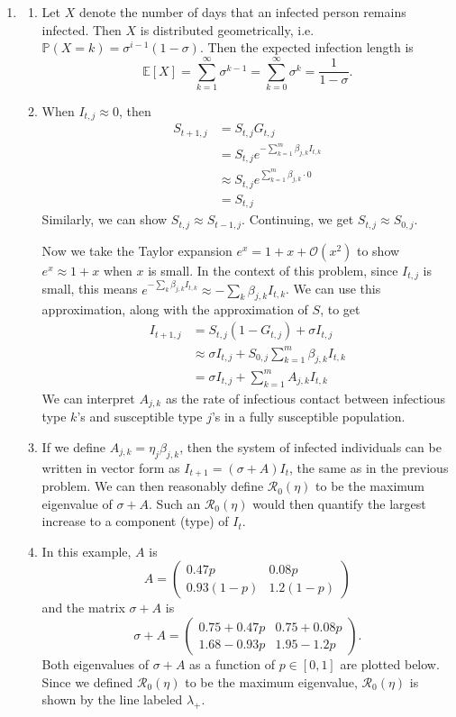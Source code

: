 \documentclass{article}
\newcommand{\rr}{\mathscr{R}_0}
\begin{document}
\begin{enumerate}
	\item 
	\begin{enumerate}
		\item Let $X$ denote the number of days that an infected person remains infected. Then $X$ is distributed geometrically, i.e. $ \mathbb{P}(X=k) = \sigma^{i-1} (1-\sigma)$. Then the expected infection length is \[ \mathbb{E}[X] = \sum_{k=1}^{\infty} \sigma^{k-1}=\sum_{k=0}^{\infty} \sigma^{k}= \frac{1}{1-\sigma} .\]

		\item When $I_{t,j} \approx 0$, then
			\begin{align*}
				S_{t+1,j}&=S_{t,j}G_{t,j}\\
					 &= S_{t,j}e^{-\sum_{k=1}^{m} \beta_{j,k}I_{t,k}} \\
					 &\approx S_{t,j}e^{\sum_{k=1}^{m} \beta_{j,k} \cdot 0} \\
					 &= S_{t,j}
			\end{align*}
			Similarly, we can show $S_{t,j}\approx S_{t-1,j}$. Continuing, we get $S_{t,j}\approx S_{0,j}$.

			Now we take the Taylor expansion $e^x = 1 + x + \mathcal{O}(x^2)$ to show $e^x \approx 1 + x$ when $x$ is small. In the context of this problem, since $I_{t,j}$ is small, this means $e^{-\sum_k \beta_{j,k} I_{t,k}} \approx -\sum_{k} \beta_{j,k}I_{t,k} $. We can use this approximation, along with the approximation of $S$, to get
			\begin{align*}
				I_{t+1,j}&=S_{t,j}(1-G_{t,j}) + \sigma I_{t,j} \\
					 &\approx \sigma I_{t,j} + S_{0,j} \sum_{k=1}^{m} \beta_{j,k}I_{t,k} \\
					 &= \sigma I_{t,j} + \sum_{k=1}^{m} A_{j,k}I_{t,k}
			\end{align*}
			We can interpret $A_{j,k}$ as the rate of infectious contact between infectious type $k$'s and susceptible type $j$'s in a fully susceptible population.

		\item If we define $A_{j,k} = \eta_j \beta_{j,k}$, then the system of infected individuals can be written in vector form as $I_{t+1} = (\sigma+A) I_t$, the same as in the previous problem. We can then reasonably define $\rr(\eta)$ to be the maximum eigenvalue of $\sigma+A$. Such an $\rr(\eta)$ would then quantify the largest increase to a component (type) of $I_{t}$.

		\item In this example, $A$ is
			\[
			A=
			\begin{pmatrix}
				0.47 p & 0.08 p \\
				0.93(1-p) & 1.2(1-p)
			\end{pmatrix}
			\] 
			and the matrix $\sigma + A$ is
			\[
			\sigma+A=
			\begin{pmatrix}
				0.75+0.47p & 0.75+0.08p \\
				1.68-0.93p & 1.95-1.2p
			\end{pmatrix}.
			\] 
			Both eigenvalues of $\sigma+A$ as a function of $p\in[0,1]$ are plotted below. Since we defined $\rr(\eta)$ to be the maximum eigenvalue, $\rr(\eta)$ is shown by the line labeled $\lambda_+$.


\end{enumerate}
\end{enumerate}
\end{document}
